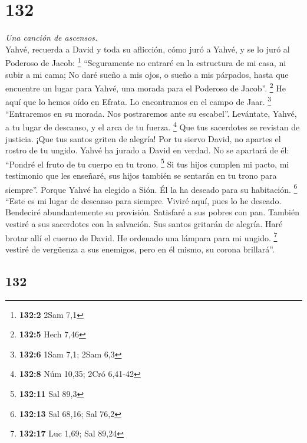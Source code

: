 \begin{paracol}{2}
\hypertarget{section-262}{%
\section{132}\label{section-262}}

\emph{Una canción de ascensos.}\\
 Yahvé, recuerda a David y toda su aflicción,
 cómo juró a Yahvé, y se lo juró al Poderoso de Jacob:
\footnote{\textbf{132:2} 2Sam 7,1}  ``Seguramente no
entraré en la estructura de mi casa, ni subir a mi cama; 
No daré sueño a mis ojos, o sueño a mis párpados,  hasta
que encuentre un lugar para Yahvé, una morada para el Poderoso de
Jacob''. \footnote{\textbf{132:5} Hech 7,46}  He aquí que
lo hemos oído en Efrata. Lo encontramos en el campo de Jaar. \footnote{\textbf{132:6}
  1Sam 7,1; 2Sam 6,3}  ``Entraremos en su morada. Nos
postraremos ante su escabel''.  Levántate, Yahvé, a tu
lugar de descanso, y el arca de tu fuerza. \footnote{\textbf{132:8} Núm
  10,35; 2Cró 6,41-42}  Que tus sacerdotes se revistan de
justicia. ¡Que tus santos griten de alegría!  Por tu
siervo David, no apartes el rostro de tu ungido.  Yahvé
ha jurado a David en verdad. No se apartará de él: ``Pondré el fruto de
tu cuerpo en tu trono. \footnote{\textbf{132:11} Sal 89,3}
 Si tus hijos cumplen mi pacto, mi testimonio que les
enseñaré, sus hijos también se sentarán en tu trono para siempre''.
 Porque Yahvé ha elegido a Sión. Él la ha deseado para su
habitación. \footnote{\textbf{132:13} Sal 68,16; Sal 76,2}
 ``Este es mi lugar de descanso para siempre. Viviré
aquí, pues lo he deseado.  Bendeciré abundantemente su
provisión. Satisfaré a sus pobres con pan.  También
vestiré a sus sacerdotes con la salvación. Sus santos gritarán de
alegría.  Haré brotar allí el cuerno de David. He
ordenado una lámpara para mi ungido. \footnote{\textbf{132:17} Luc 1,69;
  Sal 89,24}  vestiré de vergüenza a sus enemigos, pero
en él mismo, su corona brillará''.

\switchcolumn
\begin{otherlanguage}{english}

\hypertarget{section-263}{%
\section{132}\label{section-263}}


\end{otherlanguage}
\end{paracol}
